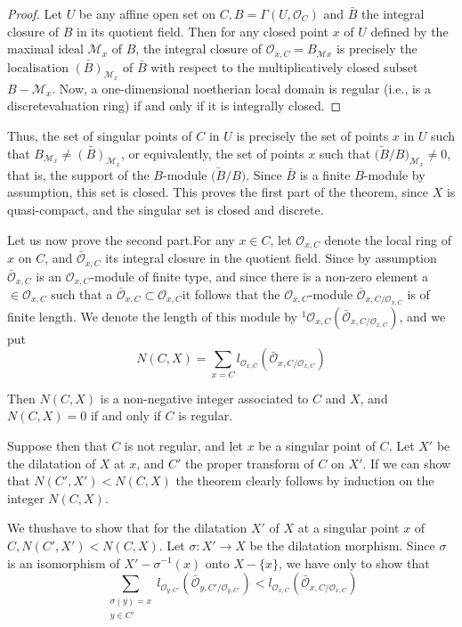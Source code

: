 \begin{proof}
  Let $U$ be any affine open set on $C, B = \Gamma (U,\mathscr{O}_C)$
  and $\bar B$ the integral closure of $B$ in its quotient field. Then
  for any closed point $x$ of $U$ defined by the maximal ideal
  $\mathcal{M}_x$  of $B$, the integral closure of
  $\mathscr{O}_{x,C}=B_{\mathcal{M}x}$ is precisely the localisation
  $\bar{(B)}_{\mathcal{M}_x}$ of $\bar B$ with respect to the
  multiplicatively closed subset $B -\mathcal{M}_x$. Now, a
  one-dimensional noetherian local domain is regular (i.e., is a
  discrete\pageoriginale valuation ring) if and only if it is
  integrally closed.  
\end{proof}

\noindent
Thus, the set of singular points of $C$ in $U$ is precisely the set of
points $x$ in $U$ such that $B_{\mathcal{M}_x} \neq
\bar{(B)}_{\mathcal{M}_x}$, or equivalently, the set of points $x$ such
that $\bar{(B}/B)_{\mathcal{M}_x} \neq 0$, that is, the support of the
$B$-module $\bar{(B}/B)$. Since $\bar B$ is a finite $B$-module by
assumption, this set is closed. This proves the first part of the
theorem, since $X$ is quasi-compact, and the singular set is closed
and discrete. 

Let us now prove the second part.For any $x \in C$, let $
\mathscr{O}_{x,C}$ denote the local ring of $x$ on $C$, and
$\bar{\mathscr{O}}_{x,C}$ its integral closure in the quotient
field. Since by assumption $\bar{\mathscr{O}}_{x,C}$ is an
$\mathscr{O}_{x,C}$-module of finite type, and since there is a
non-zero element a $\in \mathscr{O}_{x,C}$ such that a $
\bar{\mathscr{O}}_{x,C} \subset \mathscr{O}_{x,C}$it follows that the
$\mathscr{O}_{x,C}$-module $ \bar{\mathscr{O}}_{x,C /
 \mathscr{O}_{x,C}}$ is of finite length. We denote the length of
this module by ${}^1\mathscr{O}_{x,C}
(\bar{\mathscr{O}}_{x,C/\mathscr{O}_{x,C}})$, and we put 
$$
N(C,X) = \sum_{x=C}
l_{\mathscr{O}_{x,C}}(\bar{\mathscr{O}}_{x,C/\mathscr{O}_{x,C}})  
$$

Then $N(C,X)$ is a non-negative integer associated to $C$ and $X$, and
$N(C,X) =0$ if and only if $C$ is regular. 

Suppose then that $C$ is not regular, and let $x$ be a singular point
of $C$. Let $X'$ be the dilatation of $X$ at $x$, and $C'$ the proper
transform of $C$ on $X'$. If we can show that $N(C',X')< N(C,X)$ the
theorem clearly follows by induction on the integer $N( C,X)$.  

We thus\pageoriginale have to show that for the dilatation $X'$ of $X$
at a singular point $x$ of $C,N (C',X')< N (C,X)$. Let $\sigma : X' \to X $
be the dilatation morphism. Since $\sigma$ is an isomorphism of $X' -
\sigma^{-1}(x)$ onto $X-\{x\}$, we have only to show that 
$$
\sum_{ \substack {\sigma(y)=x \\ {y \in
      C'}}} l_{\mathscr{O}_{y,C'}}(\bar{\mathscr{O}}_{y,C'/\mathscr{O}_{y,C'}})
< l_{\mathscr{O}_{x,C}}(\bar{\mathscr{O}}_{x,C/\mathscr{O}_{x,C}}) 
$$

